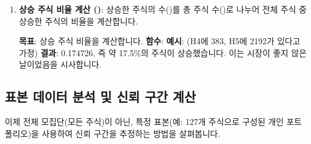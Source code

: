 \documentclass[11pt,a4paper]{article}
\begin{document}
\begin{enumerate}
    \item \textbf{상승 주식 비율 계산 ()}:
    상승한 주식의 수()를 총 주식 수()로 나누어 전체 주식 중 상승한 주식의 비율을 계산합니다.
    \begin{tcolorbox}[title=Excel 비율 계산, mybox]
        \textbf{목표}: 상승 주식 비율을 계산합니다.
        \textbf{함수}: 
        \textbf{예시}:  (H4에 383, H5에 2192가 있다고 가정)
        \textbf{결과}: 0.174726, 즉 약 17.5\%의 주식이 상승했습니다. 이는 시장이 좋지 않은 날이었음을 시사합니다.
    \end{tcolorbox}
\end{enumerate}

\subsection{표본 데이터 분석 및 신뢰 구간 계산}
이제 전체 모집단(모든 주식)이 아닌, 특정 표본(예: 127개 주식으로 구성된 개인 포트폴리오)을 사용하여 신뢰 구간을 추정하는 방법을 살펴봅니다.
\end{document}
